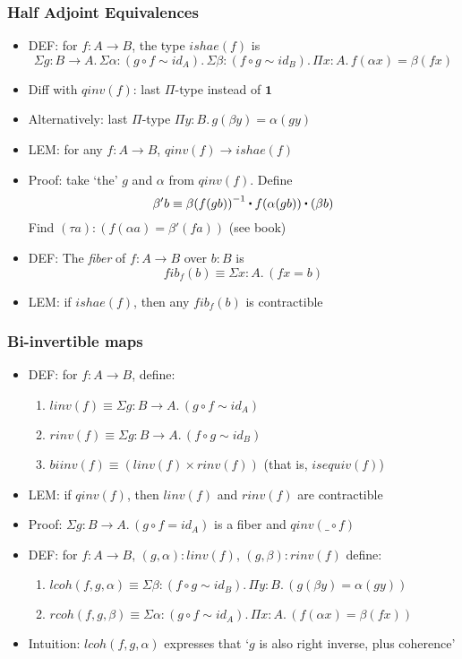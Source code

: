 \documentclass[handout]{beamer}
\newcommand{\depi}[3]{\Pi{#1{:}#2.\,#3}}
\newcommand{\sigm}[3]{\Sigma{#1{:}#2.\,#3}}
\newcommand{\bfone}{\mathbf{1}}
\newcommand{\ct}{%
  \mathchoice{\mathbin{\raisebox{0.5ex}{$\displaystyle\centerdot$}}}%
             {\mathbin{\raisebox{0.5ex}{$\centerdot$}}}%
             {\mathbin{\raisebox{0.25ex}{$\scriptstyle\,\centerdot\,$}}}%
             {\mathbin{\raisebox{0.1ex}{$\scriptscriptstyle\,\centerdot\,$}}}
}
\newcommand{\opp}[1]{\mathord{{#1}^{-1}}}
\begin{document}
\frame
  {
    \frametitle{Half Adjoint Equivalences}

    \begin{itemize}[<+->]
    \item DEF: for $f:A\to B$, the type $ishae(f)$ is 
          $$\!\!\!\!\!\!\sigm{g}{B\to A}
             {\sigm{\alpha}{(g\circ f \sim id_A)}
              {\sigm{\beta}{(f\circ g \sim id_B)}
               {\depi{x}{A}{f(\alpha x) = \beta(fx)}}}}$$
    \item Diff with $qinv(f)$:  last $\Pi$-type instead of $\bfone$
    \item Alternatively:  last $\Pi$-type $\depi{y}{B}{g(\beta y) = \alpha(gy)}$
    \item LEM: for any $f:A\to B$, $qinv(f) \to ishae(f)$
    \item Proof: take `the' $g$ and $\alpha$ from $qinv(f)$. Define
    \[\beta' b \equiv \beta\opp {(f (g b))}\ct f(\alpha (g b)) \ct (\beta b)\]
    Find $(\tau a) : (f(\alpha a) = \beta'(fa))$ (see book)
    \item DEF: The \emph{fiber} of $f:A\to B$ over $b:B$ is 
    \[fib_f (b) \equiv \sigm{x}{A}{(f x = b)}\]
    \item LEM: if $ishae(f)$, then any $fib_f (b)$ is contractible
    \end{itemize}
  }

\frame
  {
    \frametitle{Bi-invertible maps}

    \begin{itemize}[<+->]
    \item DEF: for $f:A\to B$, define:
      \begin{enumerate}[<+->]
      \item $linv(f) \equiv \sigm{g}{B\to A}{(g\circ f \sim id_A)}$ 
      \item $rinv(f) \equiv \sigm{g}{B\to A}{(f\circ g \sim id_B)}$
      \item $biinv(f) \equiv (linv(f) \times rinv(f))$  (that is, $isequiv(f)$) 
      \end{enumerate}    
    \item LEM: if $qinv(f)$, then $linv(f)$ and $rinv(f)$ are contractible
    \item Proof: $\sigm{g}{B\to A}{(g\circ f = id_A)}$ is a fiber and $qinv(\_\circ f)$
    \item DEF: for $f:A\to B$,  $(g,\alpha):linv(f)$,  $(g,\beta):rinv(f)$ define:
      \begin{enumerate}[<+->]
      \item $lcoh(f,g,\alpha) \equiv \sigm{\beta}{(f\circ g \sim id_B)}{\depi{y}{B}{(g(\beta y) = \alpha(gy))}}$ 
      \item $rcoh(f,g,\beta) \equiv \sigm{\alpha}{(g\circ f \sim id_A)}{\depi{x}{A}{(f(\alpha x) = \beta(fx))}}$     
      \end{enumerate}    
    \item Intuition: $lcoh(f,g,\alpha)$ expresses that `$g$ is also right inverse, plus coherence'
    \end{itemize}
  }
\end{document}
